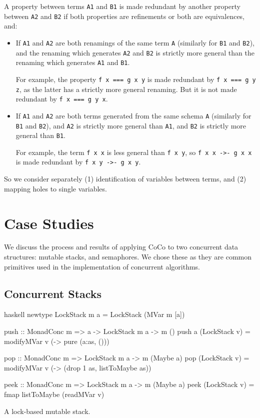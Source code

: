 A property between terms \verb|A1| and \verb|B1| is made redundant by
another property between \verb|A2| and \verb|B2| if both properties
are refinements or both are equivalences, and:

\begin{itemize}
\item If \verb|A1| and \verb|A2| are both renamings of the same term
  \verb|A| (similarly for \verb|B1| and \verb|B2|), and the renaming
  which generates \verb|A2| and \verb|B2| is strictly more general
  than the renaming which generates \verb|A1| and \verb|B1|.

  For example, the property \verb|f x === g x y| is made redundant by
  \verb|f x === g y z|, as the latter has a strictly more general
  renaming.  But it is not made redundant by \verb|f x === g y x|.

\item If \verb|A1| and \verb|A2| are both terms generated from the
  same schema \verb|A| (similarly for \verb|B1| and \verb|B2|), and
  \verb|A2| is strictly more general than \verb|A1|, and \verb|B2| is
  strictly more general than \verb|B1|.

  For example, the term \verb|f x x| is less general than \verb|f x y|,
  so \verb|f x x ->- g x x| is made redundant by
  \verb|f x y ->- g x y|.
\end{itemize}

So we consider separately (1) identification of variables between
terms, and (2) mapping holes to single variables.

\section{Case Studies}
\label{sec:coco-cases}

We discuss the process and results of applying CoCo to two concurrent
data structures: mutable stacks, and semaphores.  We chose these as
they are common primitives used in the implementation of concurrent
algorithms.

\subsection{Concurrent Stacks}
\label{sec:coco-cases-stack}

\begin{listing}
\centering
\begin{cminted}{haskell}
newtype LockStack m a = LockStack (MVar m [a])

push :: MonadConc m => a -> LockStack m a -> m ()
push a (LockStack v) = modifyMVar v (\as -> pure (a:as, ()))

pop :: MonadConc m => LockStack m a -> m (Maybe a)
pop (LockStack v) = modifyMVar v (\as -> (drop 1 as, listToMaybe as))

peek :: MonadConc m => LockStack m a -> m (Maybe a)
peek (LockStack v) = fmap listToMaybe (readMVar v)
\end{cminted}
\caption{A lock-based mutable stack.}\label{lst:lockstack}
\end{listing}

